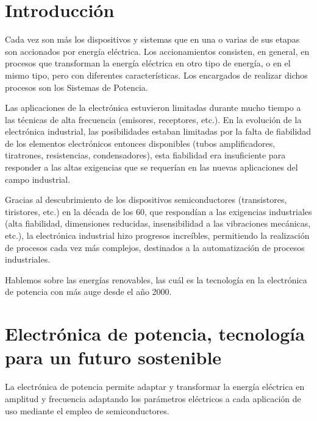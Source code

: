 \documentclass[12pt,letterpaper,superscriptaddress]{article}
\begin{document}
\clearpage

\section{Introducción}

Cada vez son más los dispositivos y sistemas que en una o varias de sus etapas son
accionados por energía eléctrica. Los accionamientos consisten, en general, en procesos que transforman la energía eléctrica en otro tipo de energía, o en el mismo tipo, pero con diferentes características. Los encargados de realizar dichos procesos son los Sistemas de Potencia.

Las aplicaciones de la electrónica estuvieron limitadas durante mucho tiempo a las técnicas de alta frecuencia (emisores, receptores, etc.). En la evolución de la electrónica industrial, las posibilidades estaban limitadas por la falta de fiabilidad de los elementos electrónicos entonces disponibles (tubos amplificadores, tiratrones, resistencias, condensadores), esta fiabilidad era insuficiente para responder a las altas exigencias que se requerían en las nuevas aplicaciones del campo industrial.


Gracias al descubrimiento de los dispositivos semiconductores (transistores, tiristores, etc.) en la década de los 60, que respondían a las exigencias industriales (alta fiabilidad, dimensiones reducidas, insensibilidad a las vibraciones mecánicas, etc.), la electrónica industrial hizo progresos increíbles, permitiendo la realización de procesos cada vez más complejos, destinados a la automatización de procesos industriales. 

Hablemos sobre las energías renovables, las cuál es la tecnología en la electrónica de potencia con más auge desde el año 2000.

\clearpage


\section{Electrónica de potencia, tecnología para un futuro sostenible}

La electrónica de potencia permite adaptar y transformar la energía eléctrica en amplitud y frecuencia adaptando los parámetros eléctricos a cada aplicación de uso mediante el empleo de semiconductores.
\end{document}
